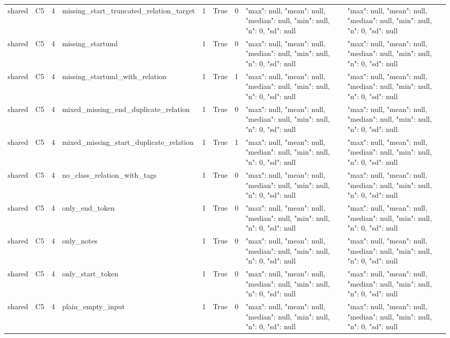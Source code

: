 \begin{tabular}{lllllllll}
shared & C5 & 4 & missing\_start\_truncated\_relation\_target & 1 & True & 0 & {"max": null, "mean": null, "median": null, "min": null, "n": 0, "sd": null} & {"max": null, "mean": null, "median": null, "min": null, "n": 0, "sd": null} \\
shared & C5 & 4 & missing\_startuml & 1 & True & 0 & {"max": null, "mean": null, "median": null, "min": null, "n": 0, "sd": null} & {"max": null, "mean": null, "median": null, "min": null, "n": 0, "sd": null} \\
shared & C5 & 4 & missing\_startuml\_with\_relation & 1 & True & 1 & {"max": null, "mean": null, "median": null, "min": null, "n": 0, "sd": null} & {"max": null, "mean": null, "median": null, "min": null, "n": 0, "sd": null} \\
shared & C5 & 4 & mixed\_missing\_end\_duplicate\_relation & 1 & True & 0 & {"max": null, "mean": null, "median": null, "min": null, "n": 0, "sd": null} & {"max": null, "mean": null, "median": null, "min": null, "n": 0, "sd": null} \\
shared & C5 & 4 & mixed\_missing\_start\_duplicate\_relation & 1 & True & 1 & {"max": null, "mean": null, "median": null, "min": null, "n": 0, "sd": null} & {"max": null, "mean": null, "median": null, "min": null, "n": 0, "sd": null} \\
shared & C5 & 4 & no\_class\_relation\_with\_tags & 1 & True & 0 & {"max": null, "mean": null, "median": null, "min": null, "n": 0, "sd": null} & {"max": null, "mean": null, "median": null, "min": null, "n": 0, "sd": null} \\
shared & C5 & 4 & only\_end\_token & 1 & True & 0 & {"max": null, "mean": null, "median": null, "min": null, "n": 0, "sd": null} & {"max": null, "mean": null, "median": null, "min": null, "n": 0, "sd": null} \\
shared & C5 & 4 & only\_notes & 1 & True & 0 & {"max": null, "mean": null, "median": null, "min": null, "n": 0, "sd": null} & {"max": null, "mean": null, "median": null, "min": null, "n": 0, "sd": null} \\
shared & C5 & 4 & only\_start\_token & 1 & True & 0 & {"max": null, "mean": null, "median": null, "min": null, "n": 0, "sd": null} & {"max": null, "mean": null, "median": null, "min": null, "n": 0, "sd": null} \\
shared & C5 & 4 & plain\_empty\_input & 1 & True & 0 & {"max": null, "mean": null, "median": null, "min": null, "n": 0, "sd": null} & {"max": null, "mean": null, "median": null, "min": null, "n": 0, "sd": null} \\

\end{tabular}

